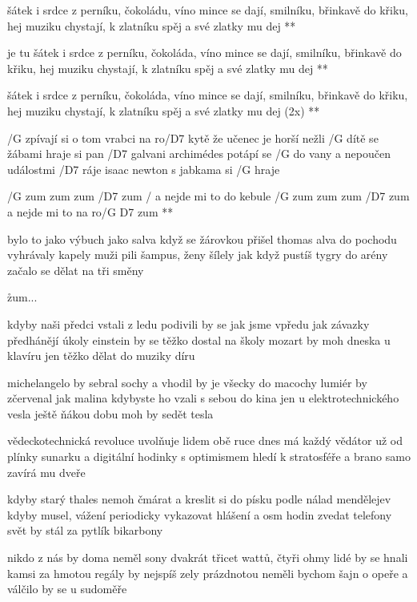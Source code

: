 \R  šátek i srdce z perníku, čokoládu, víno
    mince se dají, smilníku, břinkavě do křiku, hej
    muziku chystají, k zlatníku spěj a své zlatky mu dej **

\R  je tu šátek i srdce z perníku, čokoláda, víno
    mince se dají, smilníku, břinkavě do křiku, hej
    muziku chystají, k zlatníku spěj a své zlatky mu dej **

\R  šátek i srdce z perníku, čokoláda, víno
    mince se dají, smilníku, břinkavě do křiku, hej
    muziku chystají, k zlatníku spěj a své zlatky mu dej (2x) **




/G zpívají si o tom vrabci na ro/D7 kytě
že učenec je horší nežli /G dítě
se žábami hraje si pan /D7 galvani
archimédes potápí se /G do vany
a nepoučen událostmi /D7 ráje
isaac newton s jabkama si /G hraje

\R  /G zum zum zum /D7 zum
    / a nejde mi to do kebule
    /G zum zum zum /D7 zum
    a nejde mi to na ro/{G D7} zum **

bylo to jako výbuch jako salva
když se žárovkou přišel thomas alva
do pochodu vyhrávaly kapely
muži pili šampus, ženy šílely
jak když pustíš tygry do arény
začalo se dělat na tři směny

\r  zum...

kdyby naši předci vstali z ledu
podivili by se jak jsme vpředu
jak závazky předhánějí úkoly
einstein by se těžko dostal na školy
mozart by moh dneska u klavíru
jen těžko dělat do muziky díru \s

michelangelo by sebral sochy 
a vhodil by je všecky do macochy
lumiér by zčervenal jak malina
kdybyste ho vzali s sebou do kina
jen u elektrotechnického vesla
ještě ňákou dobu moh by sedět tesla \songgg

vědeckotechnická revoluce
uvolňuje lidem obě ruce
dnes má každý vědátor už od plínky
sunarku a digitální hodinky
s optimismem hledí k stratosféře
a brano samo zavírá mu dveře

\rr

kdyby starý thales nemoh čmárat
a kreslit si do písku podle nálad
mendělejev kdyby musel, vážení
periodicky vykazovat hlášení
a osm hodin zvedat telefony
svět by stál za pytlík bikarbony

\rr

nikdo z nás by doma neměl sony
dvakrát třicet wattů, čtyři ohmy
lidé by se hnali kamsi za hmotou
regály by nejspíš zely prázdnotou
neměli bychom šajn o opeře
a válčilo by se u sudoměře \s

